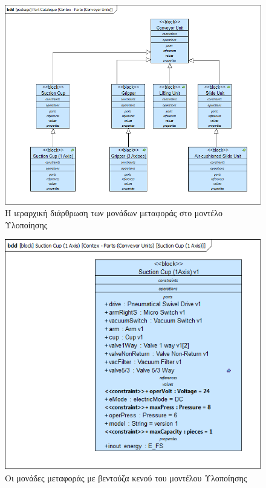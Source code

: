 \documentclass[a4paper,12pt,twoside]{report}
\begin{document}
{\begin{appendices}
				\begin{figure}[hp]
					\centering
					\includegraphics[scale=0.50]{DesignModel_Contex-Parts(ConveyorUnits).png}
					\caption{Η ιεραρχική διάρθρωση των μονάδων μεταφοράς στο μοντέλο Υλοποίησης}
					\label{φωτ:Η ιεραρχική διάρθρωση των μονάδων μεταφοράς στο μοντέλο Υλοποίησης}
				\end{figure}
				
				\begin{figure}[hp]
					\centering
					\includegraphics[scale=0.50]{DesignModel_Contex-Parts(ConveyorUnits)[SuctionCup(1Axis)].png}
					\caption{Οι μονάδες μεταφοράς με βεντούζα κενού του μοντέλου Υλοποίησης}
					\label{φωτ:Οι μονάδες μεταφοράς με βεντούζα κενού του μοντέλου Υλοποίησης}
				\end{figure}
				

\end{appendices}}
\end{document}
